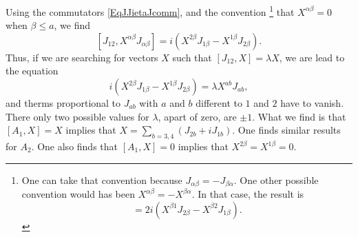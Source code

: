 Using the commutators \eqref{EqJJietaJcomm}, and the convention%
\footnote{One can take that convention because $J_{\alpha\beta}=-J_{\beta\alpha}$. One other possible convention would has been $X^{\alpha\beta}=-X^{\beta\alpha}$. In that case, the result is
\begin{equation}
	[J_{12},X^{\alpha\beta}J_{\alpha\beta}]=2i(X^{\beta 1}J_{2\beta}-X^{\beta 2}J_{1\beta}).
\end{equation}
}		%
that $X^{\alpha\beta}=0$ when $\beta\leq a$,  we find
\[ 
	[J_{12},X^{\alpha\beta}J_{\alpha\beta}]=i(X^{2\beta}J_{1\beta}-X^{1\beta}J_{2\beta}).
\]
Thus, if we are searching for vectors $X$ such that $[J_{12},X]=\lambda X$, we are lead to the equation
\begin{equation}
	i(X^{2\beta}J_{1\beta}-X^{1\beta}J_{2\beta})=\lambda X^{ab}J_{ab},
\end{equation}
and therms proportional to $J_{ab}$ with $a$ and $b$ different to $1$ and $2$ have to vanish. There only two possible values for $\lambda$, apart of zero,  are $\pm 1$. What we find is that $[A_1,X]=X$ implies that $X=\sum_{b=3,4}(J_{2b}+iJ_{1b})$. One finds similar results for $A_2$. One also finds that $[A_1,X]=0$ implies that $X^{2\beta}=X^{1\beta}=0$.

